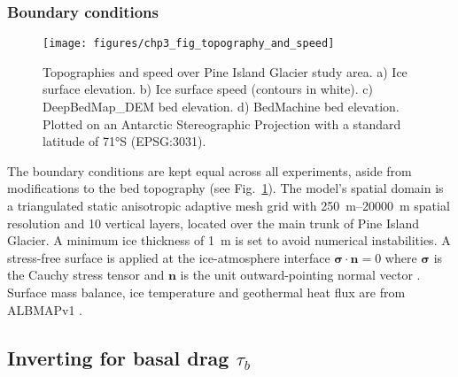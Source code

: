 



\subsubsection{Boundary conditions}

\begin{figure}[htbp]
  \texttt{[image: figures/chp3\_fig\_topography\_and\_speed]}
  \caption[Topographies and Speed over Pine Island Glacier]{
    Topographies and speed over Pine Island Glacier study area.
    a) Ice surface elevation.
    b) Ice surface speed (contours in white).
    c) DeepBedMap\_DEM bed elevation.
    d) BedMachine bed elevation.
    Plotted on an Antarctic Stereographic Projection with a standard latitude of 71°S (EPSG:3031).
  }
  \label{fig:topo_and_speed}
\end{figure}

The boundary conditions are kept equal across all experiments, aside from modifications to the bed topography (see Fig.~\ref{fig:topo_and_speed}). %
The model's spatial domain is a triangulated static anisotropic adaptive mesh grid with \SIrange{250}{20000}{\metre} spatial resolution and 10 vertical layers, located over the main trunk of Pine Island Glacier.
A minimum ice thickness of \SI{1}{\metre} is set to avoid numerical instabilities.
A stress-free surface is applied at the ice-atmosphere interface $\boldsymbol{\sigma} \cdot \boldsymbol{n} = 0$ where $\boldsymbol{\sigma}$ is the Cauchy stress tensor and $\boldsymbol{n}$ is the unit outward-pointing normal vector \citep[][eq. 18]{LarourContinentalscalehigh2012}.
Surface mass balance, ice temperature and geothermal heat flux are from ALBMAPv1 \citep{LeBrocqimprovedAntarcticdataset2010}.

\subsection{Inverting for basal drag $\tau_b$}

